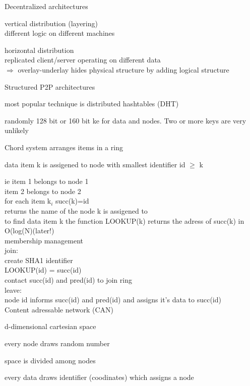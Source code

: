 \documentclass[ngerman,a4paper]{report}
\begin{document}
\begin{compactenum}
\begin{compactitem}
\end{compactitem}
\item Decentralized architectures\\
\begin{compactitem}
\item vertical distribution (layering)\\
different logic on different machines
\item horizontal distribution \\
replicated client/server operating on different data\\
$\Rightarrow$ overlay-underlay hides physical structure by adding logical structure\\
\end{compactitem}

Structured P2P architectures\\
\begin{compactitem}
\item most popular technique is distributed hashtables (DHT)\\
\item randomly 128 bit or 160 bit ke for data and nodes. Two or more keys are very unlikely\\
\item Chord system arranges items in a ring 
\item data item k is assigened to node with smallest identifier id $\geq$ k
\end{compactitem}
ie item 1 belongs to node 1\\
item 2 belongs to node 2\\
for each item k$_i$ succ(k)=id\\
returns  the name of the node k is assigened to\\
to find data item k the function LOOKUP(k) returns the adress of succ(k) in O(log(N)(later!)\\

membership management\\
join:\\
create SHA1 identifier\\
LOOKUP(id) = succ(id)\\
contact succ(id) and pred(id) to join ring\\

leave:\\
node id informs succ(id) and pred(id) and assigns it's data to succ(id)\\

Content adressable network (CAN)\\
\begin{compactitem}
\item d-dimensional cartesian space
\item every node draws random number
\item space is divided among nodes
\item every data draws identifier (coodinates) which assigns a node


\end{compactitem}
\end{compactenum}
\end{document}
